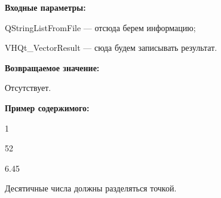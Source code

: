\textbf{Входные параметры:}

QStringListFromFile --- отсюда берем информацию;

     VHQt\_VectorResult --- сюда будем записывать результат.

\textbf{Возвращаемое значение:}

Отсутствует.

\textbf{Пример содержимого:}

1

52

6.45

Десятичные числа должны разделяться точкой.